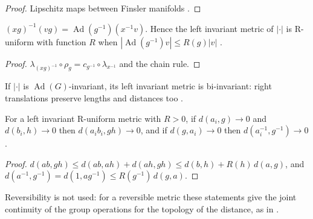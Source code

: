 \begin{proof}
  \leanok
  Lipschitz maps between Finsler manifolds \cite{LCM}.
\end{proof}

\begin{theorem}
  \label{thm:right-ad}
  \leanok
  $(xg)^{-1}(vg) = \operatorname{Ad}(g^{-1})(x^{-1}v)$. Hence the left invariant metric of $|\cdot|$ is
  R-uniform with function $R$ when $|\operatorname{Ad}(g^{-1})v| \leq R(g)|v|$ \cite[Remark~2.5]{Lar19}.
\end{theorem}

\begin{proof}
  \leanok
  $\lambda_{(xg)^{-1}} \circ \rho_g = c_{g^{-1}} \circ \lambda_{x^{-1}}$ and the chain rule.
\end{proof}

\begin{corollary}
  \label{cor:bi-invariant}
  \leanok
  If $|\cdot|$ is $\operatorname{Ad}(G)$-invariant, its left invariant metric is bi-invariant: right
  translations preserve lengths and distances too \cite[Remark~3.7]{Lar19}.
\end{corollary}

\begin{theorem}
  \label{thm:group-ops-continuous}
  \leanok
  For a left invariant R-uniform metric with $R > 0$, if $d(a_i, g) \to 0$ and $d(b_i, h) \to 0$
  then $d(a_ib_i, gh) \to 0$, and if $d(g, a_i) \to 0$ then $d(a_i^{-1}, g^{-1}) \to 0$
  \cite[Prop.~2.10(4)]{Lar19}.
\end{theorem}

\begin{proof}
  \leanok
  $d(ab, gh) \leq d(ab, ah) + d(ah, gh) \leq d(b, h) + R(h)\, d(a, g)$, and
  $d(a^{-1}, g^{-1}) = d(1, ag^{-1}) \leq R(g^{-1})\, d(g, a)$.
\end{proof}

Reversibility is not used: for a reversible metric these statements give the joint continuity
of the group operations for the topology of the distance, as in \cite[Prop.~2.10(4)]{Lar19}.
